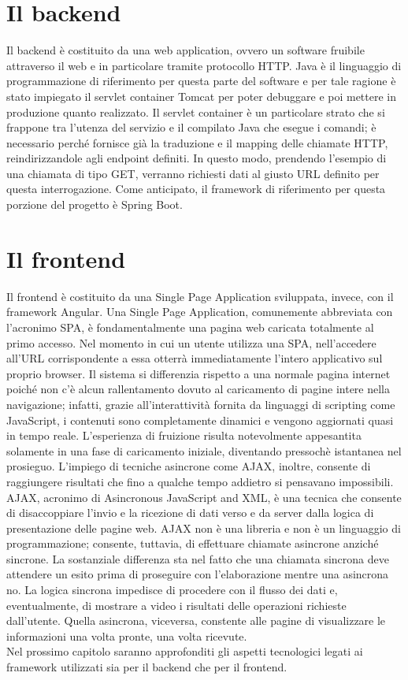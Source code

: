 \section{Il backend}

Il backend è costituito da una web application, ovvero un software fruibile attraverso il web e in particolare tramite protocollo HTTP.
Java è il linguaggio di programmazione di riferimento per questa parte del software e per tale ragione è stato impiegato il servlet container Tomcat per poter debuggare e poi
mettere in produzione quanto realizzato.
Il servlet container è un particolare strato che si frappone tra l'utenza del servizio e il compilato Java che esegue i comandi; è necessario perché fornisce già 
la traduzione e il mapping delle chiamate HTTP, reindirizzandole agli endpoint definiti.
In questo modo, prendendo l'esempio di una chiamata di tipo GET, verranno richiesti dati al giusto URL definito per questa interrogazione.
Come anticipato, il framework di riferimento per questa porzione del progetto è Spring Boot.

\section{Il frontend}

Il frontend è costituito da una Single Page Application sviluppata, invece, con il framework Angular.
Una Single Page Application, comunemente abbreviata con l'acronimo SPA, è fondamentalmente una pagina web caricata totalmente al primo accesso.
Nel momento in cui un utente utilizza una SPA, nell'accedere all'URL corrispondente a essa otterrà immediatamente l'intero applicativo sul proprio browser.
Il sistema si differenzia rispetto a una normale pagina internet poiché non c'è alcun rallentamento dovuto al caricamento di pagine intere nella navigazione; infatti, grazie 
all'interattività fornita da linguaggi di scripting come JavaScript, i contenuti sono completamente dinamici e vengono aggiornati quasi in tempo reale.
L'esperienza di fruizione risulta notevolmente appesantita solamente in una fase di caricamento iniziale, diventando pressochè istantanea nel prosieguo.
L'impiego di tecniche asincrone come AJAX, inoltre, consente di raggiungere risultati che fino a qualche tempo addietro si pensavano impossibili.
AJAX, acronimo di Asincronous JavaScript and XML, è una tecnica che consente di disaccoppiare l'invio e la ricezione di dati verso e da server dalla logica di presentazione delle 
pagine web.
AJAX non è una libreria e non è un linguaggio di programmazione; consente, tuttavia, di effettuare chiamate asincrone anziché sincrone.
La sostanziale differenza sta nel fatto che una chiamata sincrona deve attendere un esito prima di proseguire con l'elaborazione mentre una asincrona no.
La logica sincrona impedisce di procedere con il flusso dei dati e, eventualmente, di mostrare a video i risultati delle operazioni richieste dall'utente.
Quella asincrona, viceversa, constente alle pagine di visualizzare le informazioni una volta pronte, una volta ricevute.
\\
Nel prossimo capitolo saranno approfonditi gli aspetti tecnologici legati ai framework utilizzati sia per il backend che per il frontend.